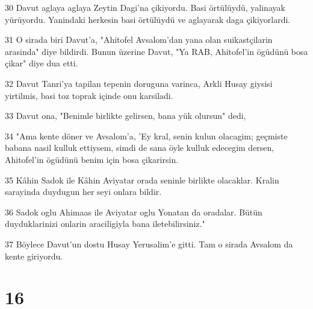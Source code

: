 \par 30 Davut aglaya aglaya Zeytin Dagi'na çikiyordu. Basi örtülüydü, yalinayak yürüyordu. Yanindaki herkesin basi örtülüydü ve aglayarak daga çikiyorlardi.
\par 31 O sirada biri Davut'a, "Ahitofel Avsalom'dan yana olan suikastçilarin arasinda" diye bildirdi. Bunun üzerine Davut, "Ya RAB, Ahitofel'in ögüdünü bosa çikar" diye dua etti.
\par 32 Davut Tanri'ya tapilan tepenin doruguna varinca, Arkli Husay giysisi yirtilmis, basi toz toprak içinde onu karsiladi.
\par 33 Davut ona, "Benimle birlikte gelirsen, bana yük olursun" dedi,
\par 34 "Ama kente döner ve Avsalom'a, 'Ey kral, senin kulun olacagim; geçmiste babana nasil kulluk ettiysem, simdi de sana öyle kulluk edecegim dersen, Ahitofel'in ögüdünü benim için bosa çikarirsin.
\par 35 Kâhin Sadok ile Kâhin Aviyatar orada seninle birlikte olacaklar. Kralin sarayinda duydugun her seyi onlara bildir.
\par 36 Sadok oglu Ahimaas ile Aviyatar oglu Yonatan da oradalar. Bütün duyduklarinizi onlarin araciligiyla bana iletebilirsiniz."
\par 37 Böylece Davut'un dostu Husay Yerusalim'e gitti. Tam o sirada Avsalom da kente giriyordu.

\chapter{16}

